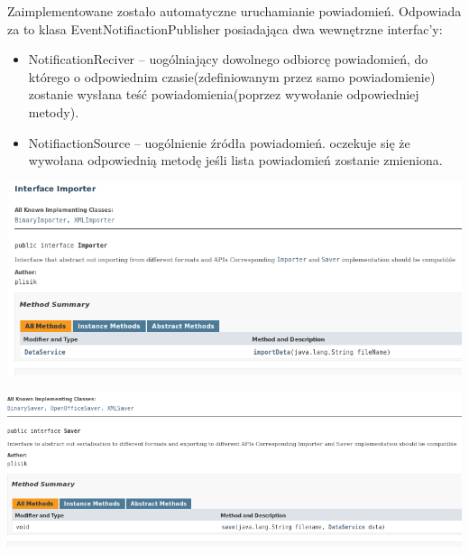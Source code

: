 \documentclass[a4paper,12pt]{article}
\begin{document}
Zaimplementowane zostało automatyczne uruchamianie powiadomień. Odpowiada za to klasa EventNotifiactionPublisher posiadająca dwa wewnętrzne interfac'y:
\begin{itemize}
\item NotificationReciver -- uogólniający dowolnego odbiorcę powiadomień, do którego o odpowiednim czasie(zdefiniowanym przez samo powiadomienie) zostanie wysłana teść powiadomienia(poprzez wywołanie odpowiedniej metody).
\item NotifiactionSource -- uogólnienie źródła powiadomień. oczekuje się że wywołana odpowiednią metodę jeśli lista powiadomień zostanie zmieniona. 
\end{itemize}



   

\begin{minipage}{\textwidth}

    \includegraphics[width=\textwidth]{./screen/logicLayer/Importer.png}
    \label{Importer}

\end{minipage}

\begin{minipage}{\textwidth}

    \includegraphics[width=\textwidth]{./screen/logicLayer/Saver.png}
    \label{Saver}

\end{minipage}
\end{document}
